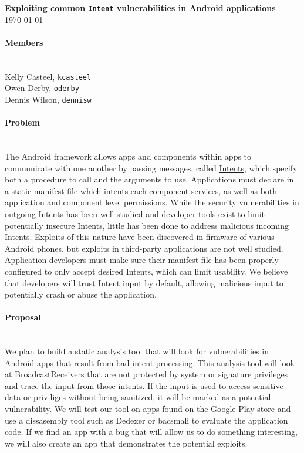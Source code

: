 \documentclass[12pt,a4paper,draft]{article}
\begin{document}


\flushleft\textbf{Exploiting common \texttt{Intent} vulnerabilities in Android %
applications}\\
\today\\

\paragraph{Members} ~\\

Kelly Casteel, \texttt{kcasteel}\\
Owen Derby, \texttt{oderby}\\
Dennis Wilson, \texttt{dennisw}\\

\paragraph{Problem} ~\\
The Android framework allows apps and components within apps to communicate with
one another by passing messages, called
\href{https://developer.android.com/reference/android/content/Intent.html}{Intents},
which specify both a procedure to call and the arguments to use. Applications
must declare in a static manifest file which intents each component services, as
well as both application and component level permissions. While the security
vulnerabilities in outgoing Intents has been well studied
\cite{chin_analyzing_2011} and developer tools exist to limit potentially
insecure Intents, little has been done to address malicious incoming
Intents. Exploits of this nature have been discovered in firmware of various
Android phones\cite{grace_systematic_2012}, but exploits in third-party
applications are not well studied. Application developers must make sure their
manifest file has been properly configured to only accept desired Intents, which
can limit usability. We believe that developers will trust Intent input by
default, allowing malicious input to potentially crash or abuse the application.

\paragraph{Proposal} ~\\
We plan to build a static analysis tool that will look for vulnerabilities in
Android apps that result from bad intent processing. This analysis tool will
look at BroadcastReceivers that are not protected by system or signature
privileges and trace the input from those intents. If the input is used to
access sensitive data or priviliges without being sanitized, it will be marked
as a potential vulnerability. We will test our tool on apps found on the
\href{https://play.google.com/store/apps}{Google Play} store and use a dissasembly tool such as Dedexer or bacsmali to evaluate the application code. If we find an app
with a bug that will allow us to do something interesting, we will also create
an app that demonstrates the potential exploits.


\end{document}

